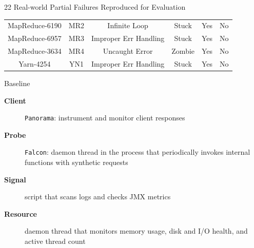 \documentclass[aspectratio=169]{beamer}
\begin{document}
\begin{frame}[allowframebreaks]{22 Real-world Partial Failures Reproduced for Evaluation}
\begin{longtable}{c|c|c|c|c|c}
        MapReduce-6190 & MR2 & Infinite Loop         & Stuck     & Yes     & No     \\
        MapReduce-6957 & MR3 & Improper Err Handling & Stuck     & Yes     & No     \\
        MapReduce-3634 & MR4 & Uncaught Error        & Zombie    & Yes     & No     \\
        \midrule
        Yarn-4254      & YN1 & Improper Err Handling & Stuck     & Yes     & No     \\
        \bottomrule
    \end{longtable}
\end{frame}

\begin{frame}{Baseline}
    \begin{description}
        \item[\textbf{Client}] \texttt{Panorama}: instrument and monitor client responses
        \item[\textbf{Probe}]  \texttt{Falcon}: daemon thread in the process that periodically invokes internal functions with synthetic requests
        \item[\textbf{Signal}] script that scans logs and checks JMX metrics
        \item[\textbf{Resource}]  daemon thread that monitors memory usage, disk and I/O health, and active thread count
    \end{description}
\end{frame}
\end{document}
